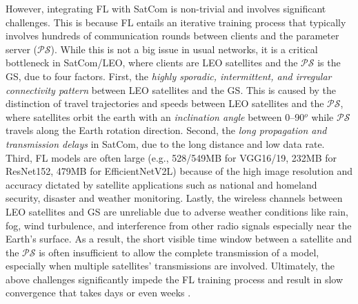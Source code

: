 \documentclass[letter,journal]{IEEEtran}
\begin{document}
However, integrating FL with SatCom is non-trivial and involves significant challenges. This is because FL entails an iterative training process that typically involves hundreds of communication rounds between clients and the parameter server ($\mathcal {PS}$). While this is not a big issue in usual networks, it is a critical bottleneck in SatCom/LEO, where clients are LEO satellites and the $\mathcal {PS}$ is the GS, due to four factors. First, the \textit{highly sporadic, intermittent, and irregular connectivity pattern} between LEO satellites and the GS. This is caused by the distinction of travel trajectories and speeds between LEO satellites and the $\mathcal{PS}$, where satellites orbit the earth with an {\em inclination angle} between 0--90$^o$ while $\mathcal{PS}$ travels along the Earth rotation direction. Second, the \textit{long propagation and transmission delays} in SatCom, due to the long distance and low data rate. Third, FL models are often large (e.g., 528/549MB for VGG16/19, 232MB for ResNet152, 479MB for EfficientNetV2L) because of the high image resolution and accuracy dictated by satellite applications such as national and homeland security, disaster and weather monitoring. Lastly, the wireless channels between LEO satellites and GS are unreliable due to adverse weather conditions like rain, fog, wind turbulence, and interference from other radio signals especially near the Earth's surface. As a result, the short visible time window between a satellite and the $\mathcal{PS}$ is often insufficient to allow the complete transmission of a model, especially when multiple satellites' transmissions are involved. Ultimately, the above challenges significantly impede the FL training process and result in slow convergence that takes days or even weeks \cite{chen2022satellite, razmi}. %
\end{document}
